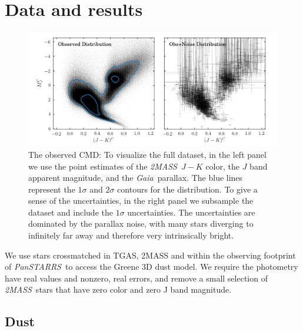 \documentclass[modern]{aastex61}
\newcommand{\acronym}[1]{{\small{#1}}}
\newcommand{\project}[1]{\textsl{#1}}
\newcommand{\tmass}{\project{\acronym{2MASS}}}
\newcommand{\gaia}{\project{Gaia}}
\newcommand{\panstarrs}{\project{Pan\acronym{STARRS}}}
\newcommand{\cmd}{\acronym{CMD}}
\begin{document}
\section{Data and results}
\begin{figure}
\centering
  \includegraphics[width=\textwidth]{data.png}
\caption{The observed \cmd: To visualize the full dataset, in the left panel we use the point estimates of the \tmass\ $J-K$ color, the $J$ band apparent magnitude, and the \gaia\ parallax. The blue lines represent the $1\sigma$ and $2\sigma$ contours for the distribution. To give a sense of the uncertainties, in the right panel we subsample the dataset and include the $1\sigma$ uncertainties. The uncertainties are dominated by the parallax noise, with many stars diverging to infinitely far away and therefore very intrinsically bright.}
\label{fig:data}
\end{figure}

We use stars crossmatched in TGAS, 2MASS and within the observing footprint of \panstarrs\ to access the Greene 3D dust model. We require the photometry have real values and nonzero, real errors, and remove a small selection of \tmass\ stars that have zero color and zero J band magnitude.

\subsection{Dust}
\end{document}
